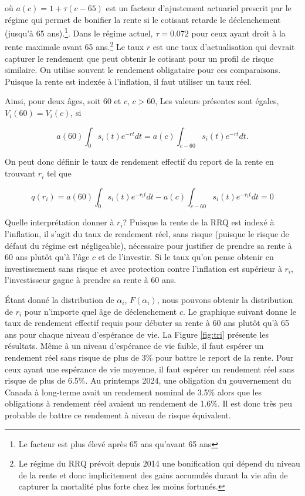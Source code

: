 \documentclass[french, 12pt]{article}
\begin{document}
où $a(c) = 1+\tau(c-65)$ est un facteur d'ajustement actuariel prescrit par le régime qui permet de bonifier la rente si le cotisant retarde le déclenchement (jusqu'à 65 ans).\footnote{Le facteur est plus élevé après 65 ans qu'avant 65 ans}. Dans le régime actuel, $\tau = 0.072$ pour ceux ayant droit à la rente maximale avant 65 ans.\footnote{Le régime du RRQ prévoit depuis 2014 une bonification qui dépend du niveau de la rente et donc implicitement des gains accumulés durant la vie afin de capturer la mortalité plus forte chez les moins fortunés.}  Le taux $r$ est une taux d'actualisation qui devrait capturer le rendement que peut obtenir le cotisant pour un profil de risque similaire. On utilise souvent le rendement obligataire pour ces comparaisons. Puisque la rente est indexée à l'inflation, il faut utiliser un taux réel. 
	 
Ainsi, pour deux âges, soit $60$ et $c$, $c>60$, Les valeurs présentes sont égales, $V_i(60) = V_i(c)$, si 
	
	
	$$a(60)\int_0 s_{i}(t)e^{-rt}dt = a(c)\int_{c-60} s_{i}(t)e^{-rt}dt .$$
	
	
	On peut donc définir le taux de rendement effectif du report de la rente en trouvant $r_i$ tel que 
	
	$$ q(r_i) =a(60) \int_0 s_{i}(t)e^{-r_i t}dt - a(c)\int_{c-60} s_{i}(t)e^{-r_i t}dt = 0$$
	
	Quelle interprétation donner à $r_i$? Puisque la rente de la RRQ est indexé à l'inflation, il s'agit du taux de rendement réel, sans risque (puisque le risque de défaut du régime est négligeable), nécessaire pour justifier de prendre sa rente à 60 ans plutôt qu'à l'âge $c$ et de l'investir. Si le taux qu'on pense obtenir en investissement sans risque et avec protection contre l'inflation est supérieur à $r_i$, l'investisseur gagne à prendre sa rente à 60 ans. 
	
	
	Étant donné la distribution de $\alpha_i$, $F(\alpha_i)$, nous pouvons obtenir la distribution de $r_i$ pour n'importe quel âge de déclenchement $c$. Le graphique suivant donne le taux de rendement effectif requis pour débuter sa rente à 60 ans plutôt qu'à 65 ans pour chaque niveau d'espérance de vie. La Figure \ref{fig:tri} présente les résultats. Même à un niveau d'espérance de vie faible, il faut espérer un rendement réel sans risque de plus de 3\% pour battre le report de la rente. Pour ceux ayant une espérance de vie moyenne, il faut espérer un rendement réel sans risque de plus de 6.5\%. Au printemps 2024, une obligation du gouvernement du Canada à long-terme avait un rendement nominal de 3.5\% alors que les obligations à rendement réel avaient un rendement de 1.6\%. Il est donc très peu probable de battre ce rendement à niveau de risque équivalent. 
	
\end{document}
